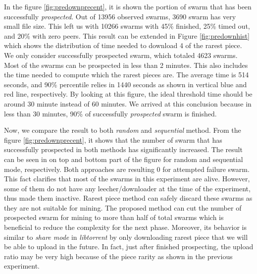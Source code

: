 In the figure \ref{fig:predownprecent}, it is shown the portion of swarm that has been successfully \textit{prospected}. Out of 13956 observed swarms, 3690 swarm has very small file size. This left us with 10266 swarms with 45\% finished, 25\% timed out, and 20\% with zero peers. This result can be extended in Figure \ref{fig:predownhist} which shows the distribution of time needed to download 4 of the rarest piece. We only consider successfully prospected swarm, which totaled 4623 swarms. Most of the swarms can be prospected in less than 2 minutes. This also includes the time needed to compute which the rarest pieces are. The average time is 514 seconds, and 90\% percentile relies in 1440 seconds as shown in vertical blue and red line, respectively. By looking at this figure, the ideal threshold time should be around 30 minute instead of 60 minutes. We arrived at this conclusion because in less than 30 minutes, 90\% of successfully \textit{prospected} swarm is finished.



Now, we compare the result to both \textit{random} and \textit{sequential} method. From the figure \ref{fig:predownprecent}, it shows that the number of swarm that has successfully prospected in both methods has significantly increased. The result can be seen in on top and bottom part of the figure for random and sequential mode, respectively. Both approaches are resulting 0 for attempted failure swarm. This fact clarifies that most of the swarms in this experiment are alive. However, some of them do not have any leecher/downloader at the time of the experiment, thus made them inactive. Rarest piece method can safely discard these swarms as they are not suitable for mining. The proposed method can cut the number of prospected swarm for mining to more than half of total swarms which is beneficial to reduce the complexity for the next phase. Moreover, its behavior is similar to \textit{share mode} in \textit{libtorrent} by only downloading rarest piece that we will be able to upload in the future. In fact, just after finished prospecting, the upload ratio may be very high because of the piece rarity as shown in the previous experiment.

